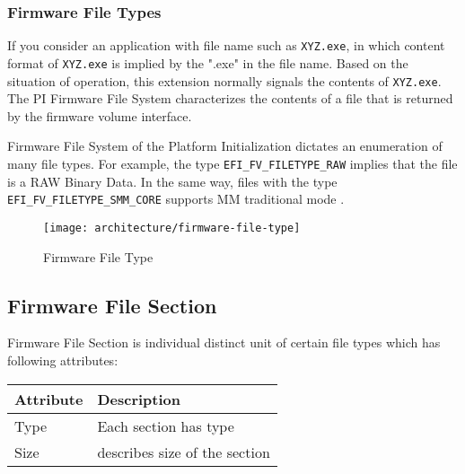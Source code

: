 \subsubsection{Firmware File Types}
If you consider an application with file name such as \texttt{XYZ.exe}, in which content format of \verb|XYZ.exe| is implied by the ".exe" in the file name. Based on the situation of operation, this extension normally signals the contents of \verb|XYZ.exe|. The PI Firmware File System characterizes the contents of a file that is returned by the firmware volume interface.

Firmware File System of the Platform Initialization dictates an enumeration of many file types. For example, the type
\verb|EFI_FV_FILETYPE_RAW| implies that the file is a RAW Binary Data. In the same way, files with the type \verb|EFI_FV_FILETYPE_SMM_CORE| supports MM traditional mode .

\begin{figure}[!htbp]
	\centering
	\texttt{[image: architecture/firmware-file-type]}
	\caption{Firmware File Type}\label{fig:firmware-file-types}
\end{figure}

\subsection{Firmware File Section}
Firmware File Section is individual distinct unit of certain file types which has following attributes:
\begin{table}[!htbp]
	\begin{tabular}{l | p{9cm}}
		Attribute & Description
		\\ \hline \hline
		Type & Each section has type 
		\\ \hline
		Size & describes size of the section
		\\ \hline
	\end{tabular}
\end{table}

